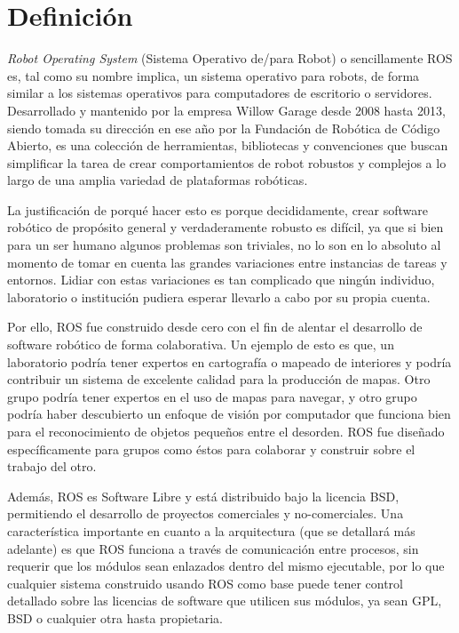 \section{Definición}

\textit{Robot Operating System} (Sistema Operativo de/para Robot) o sencillamente ROS es, tal como su nombre implica, un sistema operativo para robots, de forma similar a los sistemas operativos para computadores de escritorio o servidores. Desarrollado y mantenido por la empresa Willow Garage desde 2008 hasta 2013, siendo tomada su dirección en ese año por la Fundación de Robótica de Código Abierto, es una colección de herramientas, bibliotecas y convenciones que buscan simplificar la tarea de crear comportamientos de robot robustos y complejos a lo largo de una amplia variedad de plataformas robóticas.

La justificación de porqué hacer esto es porque decididamente, crear software robótico de propósito general y verdaderamente robusto es difícil, ya que si bien para un ser humano algunos problemas son triviales, no lo son en lo absoluto al momento de tomar en cuenta las grandes variaciones entre instancias de tareas y entornos. Lidiar con estas variaciones es tan complicado que ningún individuo, laboratorio o institución pudiera esperar llevarlo a cabo por su propia cuenta.

Por ello, ROS fue construido desde cero con el fin de alentar el desarrollo de software robótico de forma colaborativa. Un ejemplo de esto es que, un laboratorio podría tener expertos en cartografía o mapeado de interiores y podría contribuir un sistema de excelente calidad para la producción de mapas. Otro grupo podría tener expertos en el uso de mapas para navegar, y otro grupo podría haber descubierto un enfoque de visión por computador que funciona bien para el reconocimiento de objetos pequeños entre el desorden. ROS fue diseñado específicamente para grupos como éstos para colaborar y construir sobre el trabajo del otro. \cite{aboutros}

Además, ROS es Software Libre y está distribuido bajo la licencia BSD, permitiendo el desarrollo de proyectos comerciales y no-comerciales. Una característica importante en cuanto a la arquitectura (que se detallará más adelante) es que ROS funciona a través de comunicación entre procesos, sin requerir que los módulos sean enlazados dentro del mismo ejecutable, por lo que cualquier sistema construido usando ROS como base puede tener control detallado sobre las licencias de software que utilicen sus módulos, ya sean GPL, BSD o cualquier otra hasta propietaria. \cite{quigley2009ros}

